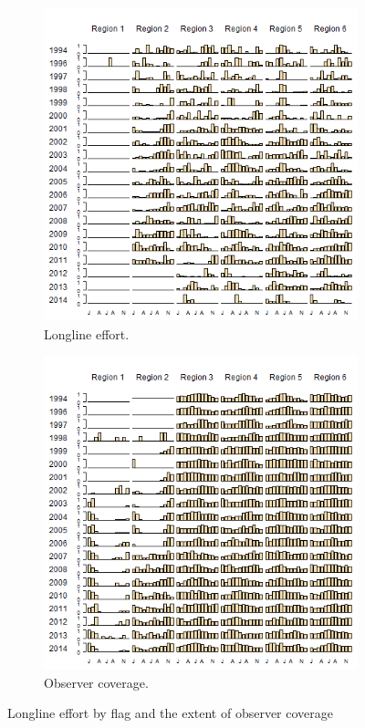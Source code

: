 \documentclass[12pt]{SCreport}
\begin{document}
\begin{landscape}
\begin{figure}
\centering
   \begin{subfigure}[b]{0.6\textwidth}
       \includegraphics[width=\textwidth]{../GRAPHICS/Defined/FIG_06a_obsBY_mm_RDS}
       \caption{Longline effort.}
       \label{fig:test1}
   \end{subfigure}
   \begin{subfigure}[b]{0.6\textwidth}
       \includegraphics[width=\textwidth]{../GRAPHICS/Defined/FIG_06b_LOGSHEET_mm_RDS}
       \caption{Observer coverage.}
       \label{fig:test2}
   \end{subfigure}
\caption{Longline effort by flag and the extent of observer coverage}
\label{fig:test} 
\end{figure}
\end{landscape}
\end{document}
